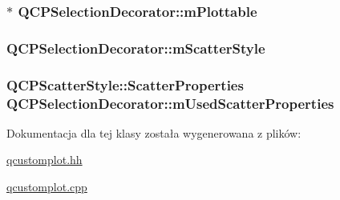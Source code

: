\subsubsection[{\texorpdfstring{m\+Plottable}{mPlottable}}]{$\ast$ Q\+C\+P\+Selection\+Decorator\+::m\+Plottable\hspace{0.3cm}{\ttfamily [protected]}}\hypertarget{class_q_c_p_selection_decorator_a25250a1d29b0723c4fa59a97e62f5758}{}\label{class_q_c_p_selection_decorator_a25250a1d29b0723c4fa59a97e62f5758}
\subsubsection[{\texorpdfstring{m\+Scatter\+Style}{mScatterStyle}}]{ Q\+C\+P\+Selection\+Decorator\+::m\+Scatter\+Style\hspace{0.3cm}{\ttfamily [protected]}}\hypertarget{class_q_c_p_selection_decorator_a5b822197a1bf802c5cf8c3dc43ca549a}{}\label{class_q_c_p_selection_decorator_a5b822197a1bf802c5cf8c3dc43ca549a}
\subsubsection[{\texorpdfstring{m\+Used\+Scatter\+Properties}{mUsedScatterProperties}}]{\setlength{\rightskip}{0pt plus 5cm}Q\+C\+P\+Scatter\+Style\+::\+Scatter\+Properties Q\+C\+P\+Selection\+Decorator\+::m\+Used\+Scatter\+Properties\hspace{0.3cm}{\ttfamily [protected]}}\hypertarget{class_q_c_p_selection_decorator_acb4f6af085283c9ce7d5c168fb53e855}{}\label{class_q_c_p_selection_decorator_acb4f6af085283c9ce7d5c168fb53e855}


Dokumentacja dla tej klasy została wygenerowana z plików\+:\begin{DoxyCompactItemize}
\item 
\hyperlink{qcustomplot_8hh}{qcustomplot.\+hh}\item 
\hyperlink{qcustomplot_8cpp}{qcustomplot.\+cpp}\end{DoxyCompactItemize}
